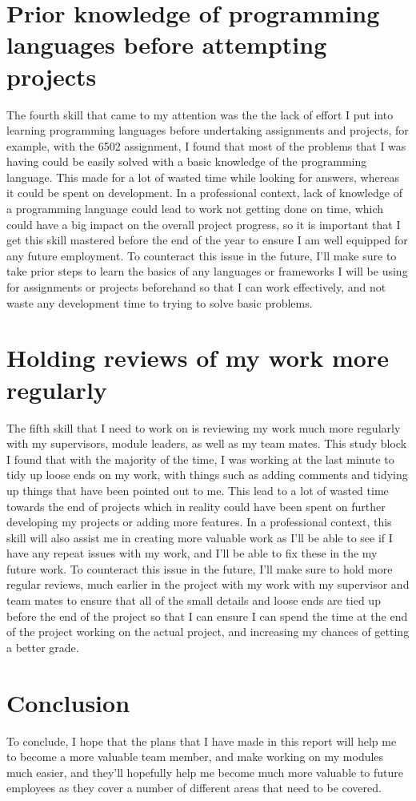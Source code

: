 \documentclass{scrartcl}
\begin{document}
\section{Prior knowledge of programming languages before attempting projects}
The fourth skill that came to my attention was the the lack of effort I put into learning programming languages before undertaking assignments and projects, for example, with the 6502 assignment, I found that most of the problems that I was having could be easily solved with a basic knowledge of the programming language. This made for a lot of wasted time while looking for answers, whereas it could be spent on development. In a professional context, lack of knowledge of a programming language could lead to work not getting done on time, which could have a big impact on the overall project progress, so it is important that I get this skill mastered before the end of the year to ensure I am well equipped for any future employment. To counteract this issue in the future, I'll make sure to take prior steps to learn the basics of any languages or frameworks I will be using for assignments or projects beforehand so that I can work effectively, and not waste any development time to trying to solve basic problems. 


\section{Holding reviews of my work more regularly}
The fifth skill that I need to work on is reviewing my work much more regularly with my supervisors, module leaders, as well as my team mates. This study block I found that with the majority of the time, I was working at the last minute to tidy up loose ends on my work, with things such as adding comments and tidying up things that have been pointed out to me. This lead to a lot of wasted time towards the end of projects which in reality could have been spent on further developing my projects or adding more features. In a professional context, this skill will also assist me in creating more valuable work as I'll be able to see if I have any repeat issues with my work, and I'll be able to fix these in the my future work. To counteract this issue in the future, I'll make sure to hold more regular reviews, much earlier in the project with my work with my supervisor and team mates to ensure that all of the small details and loose ends are tied up before the end of the project so that I can ensure I can spend the time at the end of the project working on the actual project, and increasing my chances of getting a better grade.

\section{Conclusion}
To conclude, I hope that the plans that I have made in this report will help me to become a more valuable team member, and make working on my modules much easier, and they'll hopefully help me become much more valuable to future employees as they cover a number of different areas that need to be covered. 







\end{document}
